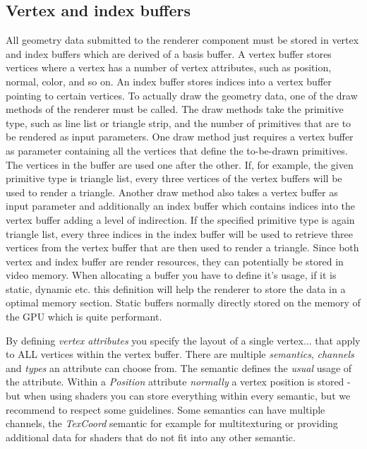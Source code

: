 \subsection{Vertex and index buffers}
All geometry data submitted to the renderer component must be stored in vertex and index buffers which are derived of a basis buffer. A vertex buffer stores vertices where a vertex has a number of vertex attributes, such as position, normal, color, and so on. An index buffer stores indices into a vertex buffer pointing to certain vertices. To actually draw the geometry data, one of the draw methods of the renderer must be called. The draw methods take the primitive type, such as line list or triangle strip, and the number of primitives that are to be rendered as input parameters. One draw method just requires a vertex buffer as parameter containing all the vertices that define the to-be-drawn primitives. The vertices in the buffer are used one after the other. If, for example, the given primitive type is triangle list, every three vertices of the vertex buffers will be used to render a triangle. Another draw method also takes a vertex buffer as input parameter and additionally an index buffer which contains indices into the vertex buffer adding a level of indirection. If the specified primitive type is again triangle list, every three indices in the index buffer will be used to retrieve three vertices from the vertex buffer that are then used to render a triangle. Since both vertex and index buffer are render resources, they can potentially be stored in video memory. When allocating a buffer you have to define it's usage, if it is static, dynamic etc. this definition will help the renderer to store the data in a optimal memory section. Static buffers normally directly stored on the 
memory of the GPU which is quite performant.

By defining \emph{vertex attributes} you specify the layout of a single vertex... that apply to ALL vertices within the vertex buffer. There are multiple \emph{semantics}, \emph{channels} and \emph{types} an attribute can choose from. The semantic defines the \emph{usual} usage of the attribute. Within a \emph{Position} attribute \emph{normally} a vertex position is stored - but when using shaders you can store everything within every semantic, but we recommend to respect some guidelines. Some semantics can have multiple channels, the \emph{TexCoord} semantic for example for multitexturing or providing additional data for shaders that do not fit into any other semantic.

